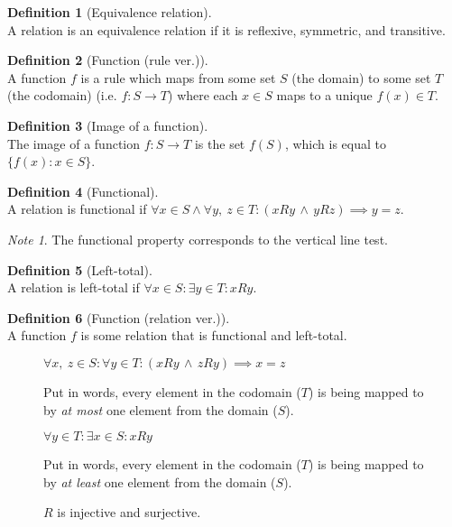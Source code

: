 \documentclass{article}
\theoremstyle{plain}
\numberwithin{theorem}{section}
\theoremstyle{definition}
\newtheorem{definition}{Definition}[section]
\numberwithin{definition}{section}
\theoremstyle{remark}
\newtheorem{note}{Note}[section]
\numberwithin{note}{section}
\begin{document}
\begin{adjustwidth}{-10pt}{-10pt}
\begin{multicols}{2}
\begin{definition}[Equivalence relation]\ \\
    A relation is an equivalence relation if it is
    reflexive, symmetric, and transitive.
\end{definition}
\begin{definition}[Function (rule ver.)]\ \\
    A function $f$ is a rule which maps
    from some set $S$ (the domain)
    to some set $T$ (the codomain)
    (i.e. $ f: S \to T$) where each $x \in S$ maps to a unique $f(x) \in T$.
\end{definition}
\begin{definition}[Image of a function]\ \\
    The image of a function $f: S \to T$ is the set $f(S)$,
    which is equal to $\{f(x):x \in S\}$.
\end{definition}
\begin{definition}[Functional]\ \\
    A relation is functional if
    $\forall x \in S \land \forall y,\: z \in T
        : (xRy \, \land \, yRz) \implies y=z$.
\end{definition}
\begin{note}
    The functional property corresponds to the vertical line test.
\end{note}
\begin{definition}[Left-total]\ \\
    A relation is left-total if
    $\forall x \in S : \exists y \in T : xRy$.
\end{definition}
\begin{definition}[Function (relation ver.)]\ \\
    A function $f$ is some relation that is functional and left-total.
\end{definition}
\end{multicols}
\end{adjustwidth}
%
\begin{figure}[H]
\begin{mdframed}[style=exampledefault,frametitle={Function properties}]
\begin{description}[style=sameline]
	\item[Injective (one-to-one):]
		$\forall x,\: z \in S : \forall y \in T
		: (xRy \,\land\, zRy) \implies x = z$

		Put in words, every element in the codomain ($T$)
		is being mapped to by \textit{at most} one element from the domain ($S$).
	\item[Surjective (onto):]
		$\forall y \in T : \exists x \in S : xRy$

		Put in words, every element in the codomain ($T$)
		is being mapped to by \textit{at least} one element from the domain ($S$).
	\item[Bijective:]
		$R$ is injective and surjective.
\end{description}
\end{mdframed}
\end{figure}
\end{document}
